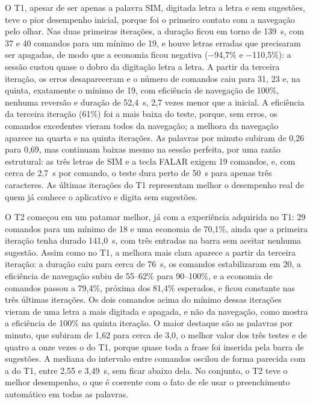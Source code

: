 O T1, apesar de ser apenas a palavra SIM, digitada letra a letra e sem sugestões, teve o pior desempenho inicial, porque foi o primeiro contato com a navegação pelo olhar. Nas duas primeiras iterações, a duração ficou em torno de 139~s, com 37 e 40 comandos para um mínimo de 19, e houve letras erradas que precisaram ser apagadas, de modo que a economia ficou negativa ($-$94,7\% e $-$110,5\%): a sessão custou quase o dobro da digitação letra a letra. A partir da terceira iteração, os erros desapareceram e o número de comandos caiu para 31, 23 e, na quinta, exatamente o mínimo de 19, com eficiência de navegação de 100\%, nenhuma reversão e duração de 52,4~s, 2,7 vezes menor que a inicial. A eficiência da terceira iteração (61\%) foi a mais baixa do teste, porque, sem erros, os comandos excedentes vieram todos da navegação; a melhora da navegação aparece na quarta e na quinta iterações. As palavras por minuto subiram de 0,26 para 0,69, mas continuam baixas mesmo na sessão perfeita, por uma razão estrutural: as três letras de SIM e a tecla FALAR exigem 19 comandos, e, com cerca de 2,7~s por comando, o teste dura perto de 50~s para apenas três caracteres. As últimas iterações do T1 representam melhor o desempenho real de quem já conhece o aplicativo e digita sem sugestões.

O T2 começou em um patamar melhor, já com a experiência adquirida no T1: 29 comandos para um mínimo de 18 e uma economia de 70,1\%, ainda que a primeira iteração tenha durado 141,0~s, com três entradas na barra sem aceitar nenhuma sugestão. Assim como no T1, a melhora mais clara aparece a partir da terceira iteração: a duração caiu para cerca de 76~s, os comandos estabilizaram em 20, a eficiência de navegação subiu de 55--62\% para 90--100\%, e a economia de comandos passou a 79,4\%, próxima dos 81,4\% esperados, e ficou constante nas três últimas iterações. Os dois comandos acima do mínimo dessas iterações vieram de uma letra a mais digitada e apagada, e não da navegação, como mostra a eficiência de 100\% na quinta iteração. O maior destaque são as palavras por minuto, que subiram de 1,62 para cerca de 3,0, o melhor valor dos três testes e de quatro a onze vezes o do T1, porque quase toda a frase foi inserida pela barra de sugestões. A mediana do intervalo entre comandos oscilou de forma parecida com a do T1, entre 2,55 e 3,49~s, sem ficar abaixo dela. No conjunto, o T2 teve o melhor desempenho, o que é coerente com o fato de ele usar o preenchimento automático em todas as palavras.

